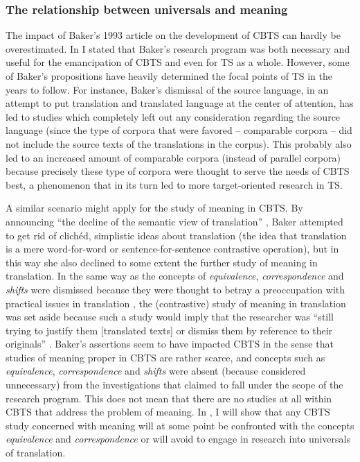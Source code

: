 \subsubsection{\label{sec:2.2.2.6}  The relationship between universals and meaning}

The impact of Baker’s 1993 article on the development of CBTS can hardly be overestimated. In  I stated that Baker’s research program was both necessary and useful for the emancipation of CBTS and even for TS as a whole. However, some of Baker’s propositions have heavily determined the focal points of TS in the years to follow. For instance, Baker’s dismissal of the source language, in an attempt to put translation and translated language at the center of attention, has led to studies which completely left out any consideration regarding the source language (since the type of corpora that were favored – comparable corpora – did not include the source texts of the translations in the corpus). This probably also led to an increased amount of comparable corpora (instead of parallel corpora) because precisely these type of corpora were thought to serve the needs of CBTS best, a phenomenon that in its turn led to more target-oriented research in TS.



A similar scenario might apply for the study of meaning in CBTS. By announcing “the decline of the semantic view of translation” \citep[237]{baker_corpus_1993}, Baker attempted to get rid of clichéd, simplistic ideas about translation (the idea that translation is a mere word-for-word or sentence-for-sentence contrastive operation), but in this way she also declined to some extent the further study of meaning in translation. In the same way as the concepts of \textit{equivalence}, \textit{correspondence} and \textit{shifts} were dismissed because they were thought to betray a preoccupation with practical issues in translation \citep[235]{baker_corpus_1993}, the (contrastive) study of meaning in translation was set aside because such a study would imply that the researcher was “still trying to justify them [translated texts] or dismiss them by reference to their originals” \citep[235]{baker_corpus_1993}. Baker’s assertions seem to have impacted CBTS in the sense that studies of meaning proper in CBTS are rather scarce, and concepts such as \textit{equivalence}, \textit{correspondence} and \textit{shifts} were absent (because considered unnecessary) from the investigations that claimed to fall under the scope of the research program. This does not mean that there are no studies at all within CBTS that address the problem of meaning. In , I will show that any CBTS study concerned with meaning will at some point be confronted with the concepts \textit{equivalence} and \textit{correspondence} or will avoid to engage in research into universals of translation.



